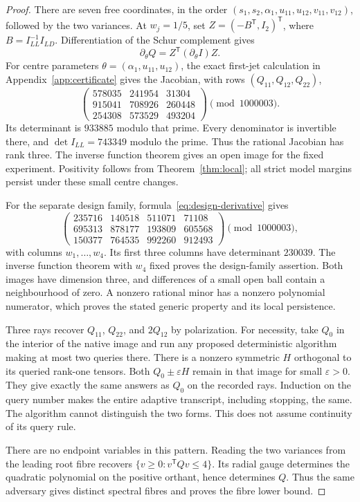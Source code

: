 \documentclass[11pt,reqno]{amsart}
\numberwithin{equation}{section}
\theoremstyle{definition}
\theoremstyle{remark}
\newcommand{\eps}{\varepsilon}
\begin{document}
\begin{proof}
There are seven free coordinates, in the order
$(s_1,s_2,\alpha_1,u_{11},u_{12},v_{11},v_{12})$, followed by the two variances. At $w_j=1/5$, set $Z=(-B^{\mathsf T},I_2)^{\mathsf T}$, where $B=I_{LL}^{-1}I_{LD}$. Differentiation of the Schur complement gives
\[
 \partial_\theta Q=Z^{\mathsf T}(\partial_\theta I)Z.
\]
For centre parameters $\theta=(\alpha_1,u_{11},u_{12})$, the exact first-jet calculation in Appendix~\ref{app:certificate} gives the Jacobian, with rows $(Q_{11},Q_{12},Q_{22})$,
\begin{equation}\label{eq:center-jac}
 \begin{pmatrix}578035&241954&31304\\
 915041&708926&260448\\254308&573529&493204\end{pmatrix}
 \pmod {1000003}.
\end{equation}
Its determinant is $933885$ modulo that prime. Every denominator is invertible there, and $\det I_{LL}=743349$ modulo the prime. Thus the rational Jacobian has rank three. The inverse function theorem gives an open image for the fixed experiment. Positivity follows from Theorem~\ref{thm:local}; all strict model margins persist under these small centre changes.

For the separate design family, formula~\eqref{eq:design-derivative} gives
\begin{equation}\label{eq:mod-jac}
 \begin{pmatrix}
 235716&140518&511071&71108\\
 695313&878177&193809&605568\\
 150377&764535&992260&912493
 \end{pmatrix}\pmod {1000003},
\end{equation}
with columns $w_1,\ldots,w_4$. Its first three columns have determinant $230039$. The inverse function theorem with $w_4$ fixed proves the design-family assertion. Both images have dimension three, and differences of a small open ball contain a neighbourhood of zero. A nonzero rational minor has a nonzero polynomial numerator, which proves the stated generic property and its local persistence.

Three rays recover $Q_{11}$, $Q_{22}$, and $2Q_{12}$ by polarization. For necessity, take $Q_0$ in the interior of the native image and run any proposed deterministic algorithm making at most two queries there. There is a nonzero symmetric $H$ orthogonal to its queried rank-one tensors. Both $Q_0\pm\eps H$ remain in that image for small $\eps>0$. They give exactly the same answers as $Q_0$ on the recorded rays. Induction on the query number makes the entire adaptive transcript, including stopping, the same. The algorithm cannot distinguish the two forms. This does not assume continuity of its query rule.

There are no endpoint variables in this pattern. Reading the two variances from the leading root fibre recovers $\{v\ge0:v^{\mathsf T}Qv\le4\}$. Its radial gauge determines the quadratic polynomial on the positive orthant, hence determines $Q$. Thus the same adversary gives distinct spectral fibres and proves the fibre lower bound.
\end{proof}
\end{document}
